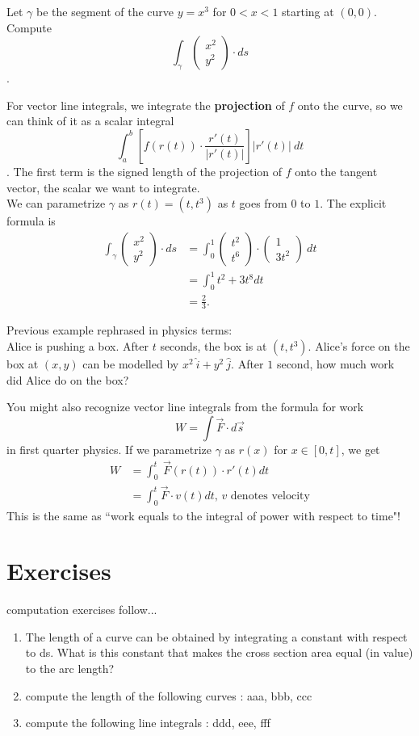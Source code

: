 \documentclass[11pt,openany]{book}
\newcommand*{\exercises}{\section*{\exercisename}}
\newcommand{\exercisename}{Exercises}
\newcommand{\example}[1]{\begin{tcolorbox}[title=Example,colframe=yellow!50!white,colback=yellow!20!white,coltitle=black]{#1}\end{tcolorbox}
}
\begin{document}
	\example{
		Let $\gamma$ be the segment of the curve $y=x^3$ for $0<x<1$ starting at $(0,0)$.
		Compute 
		\[
		\int_{\gamma} \begin{pmatrix}
			x^2 \\ y^2
		\end{pmatrix} \cdot ds
		\]
		.
	}
	For vector line integrals, we integrate the \textbf{projection} of $f$ onto the curve, so we can think of it as a scalar integral \[
		\int_a^b \left[ f(r(t)) \cdot \frac{r'(t)}{|r'(t)|}  \right]   |r'(t)| \ dt
	\]
	. The first term is the signed length of the projection of $f$ onto the tangent vector, the scalar we want to integrate.
	\\
	We can parametrize $\gamma$ as $r(t) = (t,t^3)$ as $t$ goes from $0$ to $1$.
	The explicit formula is \begin{align*}
		\int_{\gamma} \begin{pmatrix}
			x^2 \\ y^2
		\end{pmatrix} \cdot ds &= \int_{0}^1 \begin{pmatrix}
			t^2 \\ t^6
		\end{pmatrix} \cdot  \begin{pmatrix}
			1 \\ 3t^2
		\end{pmatrix} \ dt
		\\
		&= \int_0^1 t^2+3t^8 dt \\
		&= \frac{2}{3}.
	\end{align*}
	\example{
		Previous example rephrased in physics terms:\\
		Alice is pushing a box. After $t$ seconds, the box is at $(t,t^3)$. Alice's force on the box at $(x,y)$ can be modelled by
		$x^2 \ \hat{i} + y^2\ \hat{j}$. After $1$ second, how much work did Alice do on the box?
	}
	You might also recognize vector line integrals from the formula for work \[
	W = \int \vec{F} \cdot d\vec{s} 
	\]
	in first quarter physics. If we parametrize $\gamma$ as ${r}(x)$ for $x \in [0,t]$, we get 
	\begin{align*}
		W &= \int_0^t \ \vec{F}(r(t)) \cdot {r}'(t) dt \\
		&= \int_0^t \vec{F} \cdot v(t) dt \textrm{, $v$ denotes velocity}
	\end{align*}
	This is the same as ``work equals to the integral of power with respect to time"!
	
	\exercises
	computation exercises follow...
	\begin{enumerate}
		\item The length of a curve can be obtained by integrating a constant with respect to ds. What is this constant that makes the cross section area equal (in value) to the arc length? 
		\item compute the length of the following curves : aaa, bbb, ccc
		\item compute the following line integrals : ddd, eee, fff
	\end{enumerate}
	
\end{document}
